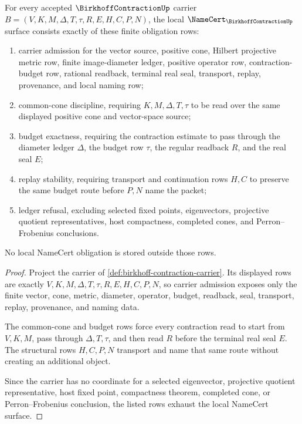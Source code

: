 \begin{theorem}
\label{thm:birkhoff-contraction-namecert-obligations}
For every accepted $\BirkhoffContractionUp$ carrier $B=(V,K,M,\Delta,T,\tau,R,E,H,C,P,N)$, the local $\NameCert_{\BirkhoffContractionUp}$ surface consists exactly of these finite obligation rows:
\begin{enumerate}
\item carrier admission for the vector source, positive cone, Hilbert projective metric row, finite image-diameter ledger, positive operator row, contraction-budget row, rational readback, terminal real seal, transport, replay, provenance, and local naming row;
\item common-cone discipline, requiring $K,M,\Delta,T,\tau$ to be read over the same displayed positive cone and vector-space source;
\item budget exactness, requiring the contraction estimate to pass through the diameter ledger $\Delta$, the budget row $\tau$, the regular readback $R$, and the real seal $E$;
\item replay stability, requiring transport and continuation rows $H,C$ to preserve the same budget route before $P,N$ name the packet;
\item ledger refusal, excluding selected fixed points, eigenvectors, projective quotient representatives, host compactness, completed cones, and Perron--Frobenius conclusions.
\end{enumerate}
No local NameCert obligation is stored outside those rows.
\end{theorem}
\begin{proof}
Project the carrier of \autoref{def:birkhoff-contraction-carrier}. Its displayed rows are exactly $V,K,M,\Delta,T,\tau,R,E,H,C,P,N$, so carrier admission exposes only the finite vector, cone, metric, diameter, operator, budget, readback, seal, transport, replay, provenance, and naming data.

The common-cone and budget rows force every contraction read to start from $V,K,M$, pass through $\Delta,T,\tau$, and then read $R$ before the terminal real seal $E$. The structural rows $H,C,P,N$ transport and name that same route without creating an additional object.

Since the carrier has no coordinate for a selected eigenvector, projective quotient representative, host fixed point, compactness theorem, completed cone, or Perron--Frobenius conclusion, the listed rows exhaust the local NameCert surface.
\end{proof}

